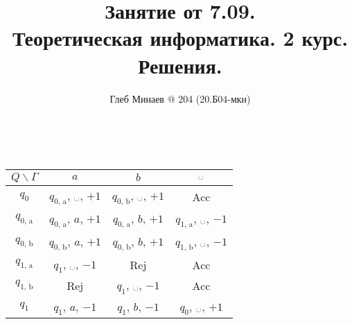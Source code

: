 \documentclass[12pt,a4paper]{article}
\title{Занятие от 7.09.\\Теоретическая информатика. 2 курс.\\Решения.}
\author{Глеб Минаев @ 204 (20.Б04-мкн)}
\newcommand{\spacesymbol}{\ensuremath{\text{\textvisiblespace}}}
\begin{document}
    \maketitle

    \begin{multicols}{2}
        \tableofcontents
    \end{multicols}

    \begin{enumproblem}\ 
        \begin{table}[H]
            \centering
            \begin{tabular}{c||c|c|c}
                $Q\backslash\Gamma$& $a$& $b$& $\spacesymbol$\\
                \hline
                \hline
                $q_0$& $q_{\text{0, a}}$, \spacesymbol, $+1$& $q_{\text{0, b}}$, \spacesymbol, $+1$& Acc\\
                \hline
                $q_{\text{0, a}}$& $q_{\text{0, a}}$, $a$, $+1$& $q_{\text{0, a}}$, $b$, $+1$& $q_{\text{1, a}}$, \spacesymbol, $-1$\\
                \hline
                $q_{\text{0, b}}$& $q_{\text{0, b}}$, $a$, $+1$& $q_{\text{0, b}}$, $b$, $+1$& $q_{\text{1, b}}$, \spacesymbol, $-1$\\
                \hline
                $q_{\text{1, a}}$& $q_{\text{1}}$, \spacesymbol, $-1$& Rej& Acc\\
                \hline
                $q_{\text{1, b}}$& Rej& $q_{\text{1}}$, \spacesymbol, $-1$& Acc\\
                \hline
                $q_1$& $q_1$, $a$, $-1$& $q_1$, $b$, $-1$& $q_0$, \spacesymbol, $+1$\\
            \end{tabular}
        \end{table}
    \end{enumproblem}
\end{document}
